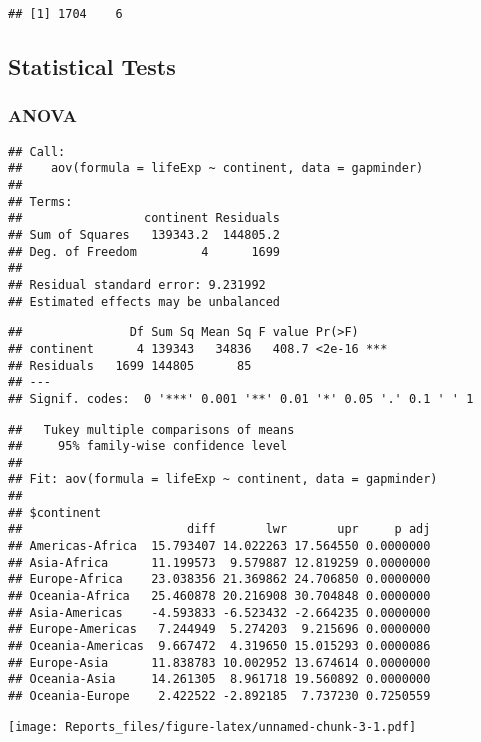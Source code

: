 \documentclass[
]{article}
\begin{document}
\begin{verbatim}
## [1] 1704    6
\end{verbatim}

\hypertarget{statistical-tests}{%
\subsection{Statistical Tests}\label{statistical-tests}}

\hypertarget{anova}{%
\subsubsection{ANOVA}\label{anova}}

\begin{verbatim}
## Call:
##    aov(formula = lifeExp ~ continent, data = gapminder)
## 
## Terms:
##                 continent Residuals
## Sum of Squares   139343.2  144805.2
## Deg. of Freedom         4      1699
## 
## Residual standard error: 9.231992
## Estimated effects may be unbalanced
\end{verbatim}

\begin{verbatim}
##               Df Sum Sq Mean Sq F value Pr(>F)    
## continent      4 139343   34836   408.7 <2e-16 ***
## Residuals   1699 144805      85                   
## ---
## Signif. codes:  0 '***' 0.001 '**' 0.01 '*' 0.05 '.' 0.1 ' ' 1
\end{verbatim}

\begin{verbatim}
##   Tukey multiple comparisons of means
##     95% family-wise confidence level
## 
## Fit: aov(formula = lifeExp ~ continent, data = gapminder)
## 
## $continent
##                       diff       lwr       upr     p adj
## Americas-Africa  15.793407 14.022263 17.564550 0.0000000
## Asia-Africa      11.199573  9.579887 12.819259 0.0000000
## Europe-Africa    23.038356 21.369862 24.706850 0.0000000
## Oceania-Africa   25.460878 20.216908 30.704848 0.0000000
## Asia-Americas    -4.593833 -6.523432 -2.664235 0.0000000
## Europe-Americas   7.244949  5.274203  9.215696 0.0000000
## Oceania-Americas  9.667472  4.319650 15.015293 0.0000086
## Europe-Asia      11.838783 10.002952 13.674614 0.0000000
## Oceania-Asia     14.261305  8.961718 19.560892 0.0000000
## Oceania-Europe    2.422522 -2.892185  7.737230 0.7250559
\end{verbatim}

\texttt{[image: Reports\_files/figure-latex/unnamed-chunk-3-1.pdf]}
\end{document}
